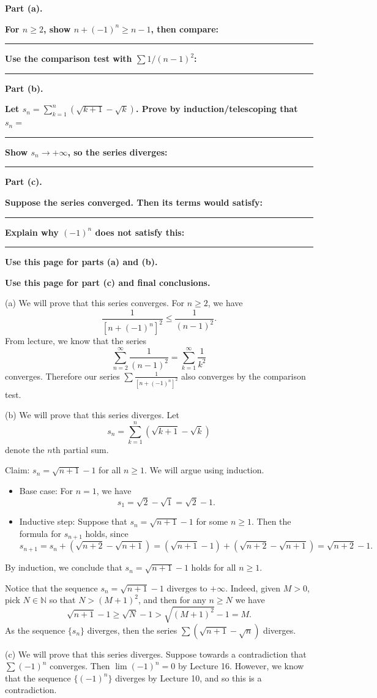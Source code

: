 \documentclass[12pt]{article}
\newcommand{\N}{\mathbb{N}}
\newcommand{\writespace}[1]{\vspace*{#1}}
\newcommand{\workquestion}[2]{%
  \par\noindent\textbf{#1}\par
  \writespace{#2}
  \noindent\rule{\linewidth}{0.35pt}\par\vspace{0.18in}%
}
\newenvironment{skeletonbox}[1]{%
  \begin{tcolorbox}[
    enhanced,
    breakable,
    colback=pass4purple,
    colframe=purple!55!black,
    fonttitle=\bfseries,
    title={Pass 4 -- Skeleton Proof\hfill #1}
  ]
}{%
  \end{tcolorbox}
}
\newcommand{\fullproofpage}[2]{%
  \begin{tcolorbox}[
    enhanced,
    colback=white,
    colframe=gray!60!black,
    fonttitle=\bfseries,
    title={Pass 5 -- Full Proof Attempt\hfill #1},
    height=8.45in
  ]
  \textbf{#2}

  \writespace{7.65in}
  \end{tcolorbox}
}
\newenvironment{solutionbox}[1]{%
  \begin{tcolorbox}[
    enhanced,
    breakable,
    colback=solgreen,
    colframe=green!45!black,
    fonttitle=\bfseries,
    title={#1}
  ]
}{%
  \end{tcolorbox}
}
\begin{document}
\newpage
\begin{skeletonbox}{Homework 6, Problem 6}
\textbf{Part (a).}
\workquestion{For \(n\ge2\), show \(n+(-1)^n\ge n-1\), then compare:}{0.95in}
\workquestion{Use the comparison test with \(\sum 1/(n-1)^2\):}{0.85in}

\textbf{Part (b).}
\workquestion{Let \(s_n=\sum_{k=1}^n(\sqrt{k+1}-\sqrt{k})\). Prove by induction/telescoping that \(s_n=\)}{0.95in}
\workquestion{Show \(s_n\to+\infty\), so the series diverges:}{0.85in}

\textbf{Part (c).}
\workquestion{Suppose the series converged. Then its terms would satisfy:}{0.8in}
\workquestion{Explain why \((-1)^n\) does not satisfy this:}{0.8in}
\end{skeletonbox}

\newpage
\fullproofpage{Homework 6, Problem 6}{Use this page for parts (a) and (b).}

\newpage
\fullproofpage{Homework 6, Problem 6}{Use this page for part (c) and final conclusions.}

\newpage
\begin{solutionbox}{Official Solution (Professor)}
(a) We will prove that this series converges. For \(n\ge2\), we have
\[
  \frac{1}{[n+(-1)^n]^2}\le \frac{1}{(n-1)^2}.
\]
From lecture, we know that the series
\[
  \sum_{n=2}^{\infty}\frac{1}{(n-1)^2}
  =
  \sum_{k=1}^{\infty}\frac1{k^2}
\]
converges. Therefore our series \(\sum \frac1{[n+(-1)^n]^2}\) also converges by the comparison test.

(b) We will prove that this series diverges. Let
\[
  s_n=\sum_{k=1}^n(\sqrt{k+1}-\sqrt{k})
\]
denote the \(n\)th partial sum.

Claim: \(s_n=\sqrt{n+1}-1\) for all \(n\ge1\). We will argue using induction.

\begin{itemize}
  \item Base case: For \(n=1\), we have
  \[
    s_1=\sqrt2-\sqrt1=\sqrt2-1.
  \]
  \item Inductive step: Suppose that \(s_n=\sqrt{n+1}-1\) for some \(n\ge1\). Then the formula for \(s_{n+1}\) holds, since
  \[
    s_{n+1}
    =
    s_n+(\sqrt{n+2}-\sqrt{n+1})
    =
    (\sqrt{n+1}-1)+(\sqrt{n+2}-\sqrt{n+1})
    =
    \sqrt{n+2}-1.
  \]
\end{itemize}
By induction, we conclude that \(s_n=\sqrt{n+1}-1\) holds for all \(n\ge1\).

Notice that the sequence \(s_n=\sqrt{n+1}-1\) diverges to \(+\infty\). Indeed, given \(M>0\), pick \(N\in\N\) so that \(N>(M+1)^2\), and then for any \(n\ge N\) we have
\[
  \sqrt{n+1}-1\ge \sqrt N-1>\sqrt{(M+1)^2}-1=M.
\]
As the sequence \(\{s_n\}\) diverges, then the series \(\sum(\sqrt{n+1}-\sqrt n)\) diverges.

(c) We will prove that this series diverges. Suppose towards a contradiction that \(\sum(-1)^n\) converges. Then \(\lim(-1)^n=0\) by Lecture 16. However, we know that the sequence \(\{(-1)^n\}\) diverges by Lecture 10, and so this is a contradiction.
\end{solutionbox}
\end{document}
